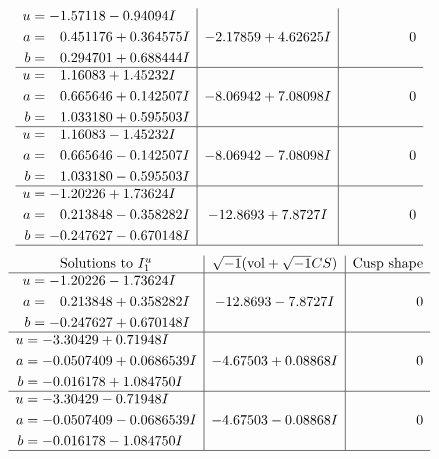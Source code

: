 \documentclass[1p]{elsarticle_modified}
\theoremstyle{definition}
\newcommand{\I}{\sqrt{-1}}
\begin{document}
$$\begin{array}{c|c|c}
\begin{aligned}
u &= -1.57118 - 0.94094 I \\
a &= \phantom{-}0.451176 + 0.364575 I \\
b &= \phantom{-}0.294701 + 0.688444 I\end{aligned}
 & -2.17859 + 4.62625 I & \phantom{-0.000000 } 0 \\ \hline\begin{aligned}
u &= \phantom{-}1.16083 + 1.45232 I \\
a &= \phantom{-}0.665646 + 0.142507 I \\
b &= \phantom{-}1.033180 + 0.595503 I\end{aligned}
 & -8.06942 + 7.08098 I & \phantom{-0.000000 } 0 \\ \hline\begin{aligned}
u &= \phantom{-}1.16083 - 1.45232 I \\
a &= \phantom{-}0.665646 - 0.142507 I \\
b &= \phantom{-}1.033180 - 0.595503 I\end{aligned}
 & -8.06942 - 7.08098 I & \phantom{-0.000000 } 0 \\ \hline\begin{aligned}
u &= -1.20226 + 1.73624 I \\
a &= \phantom{-}0.213848 - 0.358282 I \\
b &= -0.247627 - 0.670148 I\end{aligned}
 & -12.8693 + 7.8727 I & \phantom{-0.000000 } 0\\
 \hline 
 \end{array}$$\newpage$$\begin{array}{c|c|c}  
\text{Solutions to }I^u_{1}& \I (\text{vol} + \sqrt{-1}CS) & \text{Cusp shape}\\
 \hline 
\begin{aligned}
u &= -1.20226 - 1.73624 I \\
a &= \phantom{-}0.213848 + 0.358282 I \\
b &= -0.247627 + 0.670148 I\end{aligned}
 & -12.8693 - 7.8727 I & \phantom{-0.000000 } 0 \\ \hline\begin{aligned}
u &= -3.30429 + 0.71948 I \\
a &= -0.0507409 + 0.0686539 I \\
b &= -0.016178 + 1.084750 I\end{aligned}
 & -4.67503 + 0.08868 I & \phantom{-0.000000 } 0 \\ \hline\begin{aligned}
u &= -3.30429 - 0.71948 I \\
a &= -0.0507409 - 0.0686539 I \\
b &= -0.016178 - 1.084750 I\end{aligned}
 & -4.67503 - 0.08868 I & \phantom{-0.000000 } 0\\
 \hline 
 \end{array}$$\newpage\newpage\renewcommand{\arraystretch}{1}
\end{document}
